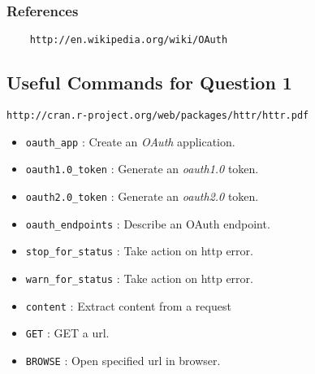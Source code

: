 \documentclass[12pt]{article}
\begin{document}
\subsubsection*{References}
	\begin{verbatim}
	http://en.wikipedia.org/wiki/OAuth
	\end{verbatim}


\newpage
\subsection*{Useful Commands for Question 1}

\begin{framed}
\begin{verbatim}
http://cran.r-project.org/web/packages/httr/httr.pdf
\end{verbatim}
\end{framed}
\begin{itemize}
	
	
	\item \texttt{oauth\_app} : Create an \textit{OAuth} application.
	
	\item \texttt{oauth1.0\_token} : Generate an \textit{oauth1.0} token.
	
	\item \texttt{oauth2.0\_token} : Generate an \textit{oauth2.0} token.

	\item \texttt{oauth\_endpoints} : Describe an OAuth endpoint.
	
	
	
	\item \texttt{stop\_for\_status} : Take action on http error.
 
    \item \texttt{warn\_for\_status} : Take action on http error.
	
	\item \texttt{content} : Extract content from a request
	
	\item \texttt{GET} : GET a url.
	
	\item \texttt{BROWSE} : Open specified url in browser.

\end{itemize}
\newpage
\end{document}
